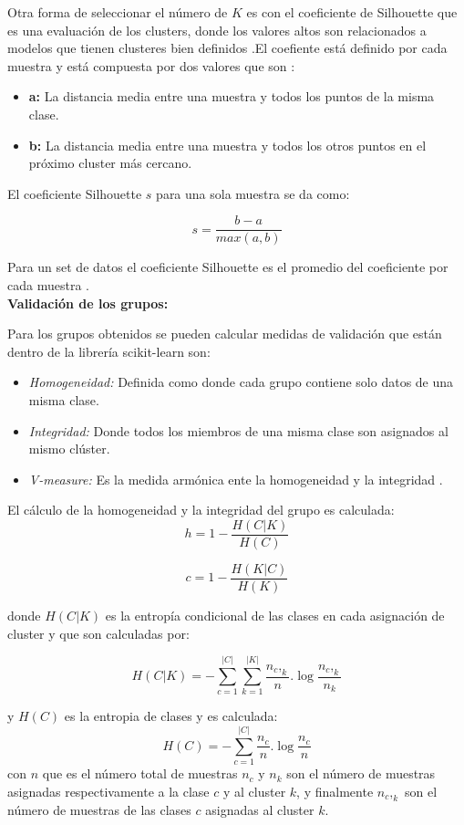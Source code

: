 {Otra forma de seleccionar el número de $K$ es con el coeficiente de Silhouette que es una evaluación de los clusters, donde los valores altos son relacionados a modelos que tienen clusteres bien definidos .El coefiente está definido por cada muestra y está compuesta por dos valores que son \cite{scikit-learn,Rousseeuw1987}:

\begin{itemize}
	\item \textbf{a:} La distancia media entre una muestra y todos los puntos de la misma clase.
	\item \textbf{b:} La distancia media entre una muestra y todos los otros puntos en el próximo cluster más cercano.
\end{itemize}

El coeficiente Silhouette $s$ para una sola muestra se da como:

$$s = \frac{b-a}{max(a,b)}$$

Para un set de datos el coeficiente Silhouette es el promedio del coeficiente por cada muestra \cite{scikit-learn,Rousseeuw1987}. \\

\textbf{Validación de los grupos:}

Para los grupos obtenidos se pueden calcular  medidas de validación que están dentro de la librería scikit-learn \cite{scikit-learn} son:

\begin{itemize}
	\item  \textit{Homogeneidad:} Definida como donde cada grupo contiene solo datos de una misma clase.
	\item \textit{Integridad:} Donde todos los miembros de una misma clase son asignados al mismo clúster.	
	\item \textit{V-measure:} Es la medida armónica ente la homogeneidad y la integridad \cite{Rosenberg2007}. 		
\end{itemize}

El cálculo de la homogeneidad y la integridad del grupo es calculada:
$$h=1- \frac{H(C|K)}{H(C)} $$

$$c=1- \frac{H(K|C)}{H(K)}$$

donde $H(C|K)$ es la entropía condicional de las clases en cada asignación de cluster y que son calculadas por:

$$H(C|K)= - \sum_{c=1}^{|C|} \sum_{k=1}^{|K|} \frac{n_c,_k}{n} . \log \frac{n_c,_k}{n_k}$$ 

y $H(C)$ es la entropia de clases y es calculada:
$$H(C)=  - \sum_{c=1}^{|C|} \frac{n_c}{n} . \log \frac{n_c}{n}$$ 
con $n$ que es el número total de muestras $n_c$ y $n_k$ son el número de muestras asignadas respectivamente a la clase $c$ y al cluster $k$, y finalmente $n_c,_k$ son el número de muestras de las clases $c$ asignadas al cluster $k$.\\

}
